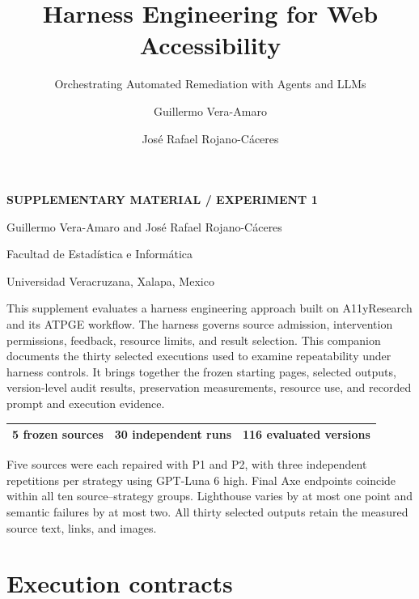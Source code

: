 \documentclass[acmsmall,screen,nonacm]{acmart}
\title[Supplementary Material -- Experiment 1]{Harness Engineering for Web Accessibility}
\subtitle{Orchestrating Automated Remediation with Agents and LLMs}
\author{Guillermo Vera-Amaro}
\author{José Rafael Rojano-Cáceres}
\affiliation{\institution{Universidad Veracruzana}\city{Xalapa}\country{Mexico}}
\begin{document}
\raggedbottom
\pagestyle{plain}
\begin{titlepage}
\vspace*{12pt}
\noindent\textcolor{HarnessBlue}{\textbf{SUPPLEMENTARY MATERIAL / EXPERIMENT 1}}\par\bigskip
{}
\medskip
{}
\vspace{22pt}
\noindent Guillermo Vera-Amaro and José Rafael Rojano-Cáceres\par
\medskip
\noindent Facultad de Estadística e Informática\par
\noindent Universidad Veracruzana, Xalapa, Mexico\par
\vspace{24pt}
\noindent{\Large\bfseries\textcolor{HarnessBlue}{Experiment 1. Harness determinism}\par}
\medskip
This supplement evaluates a harness engineering approach built on A11yResearch and its ATPGE workflow. The harness governs source admission, intervention permissions, feedback, resource limits, and result selection. This companion documents the thirty selected executions used to examine repeatability under harness controls. It brings together the frozen starting pages, selected outputs, version-level audit results, preservation measurements, resource use, and recorded prompt and execution evidence.\par
\bigskip
\noindent\begin{tabular*}{\linewidth}{@{\extracolsep{\fill}}lll@{}}\toprule
\textbf{5} frozen sources & \textbf{30} independent runs & \textbf{116} evaluated versions\\\bottomrule
\end{tabular*}\par
\bigskip
Five sources were each repaired with P1 and P2, with three independent repetitions per strategy using GPT-Luna 6 high. Final Axe endpoints coincide within all ten source--strategy groups. Lighthouse varies by at most one point and semantic failures by at most two. All thirty selected outputs retain the measured source text, links, and images.
\end{titlepage}

\section{Execution contracts}
\end{document}
